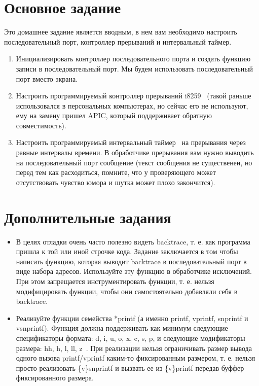 \section{Основное задание}

Это домашнее задание является вводным, в нем вам необходимо настроить
последовательный порт, контроллер прерываний и интервальный таймер.

\begin{enumerate}
  \item Инициализировать контроллер последовательного порта и создать функцию
        записи в последовательный порт. Мы будем использовать последовательный
        порт вместо экрана.
  \item Настроить программируемый контроллер прерываний i8259~\cite{INTEL:8259}
        (такой раньше использовался в персональных компьютерах, но сейчас его не
        используют, ему на замену пришел APIC, который поддерживает обратную
        совместимость).
  \item Настроить программируемый интервальный таймер~\cite{INTEL:8253} на
        прерывания через равные интервалы времени. В обработчике прерывания вам
        нужно выводить на последовательный порт сообщение (текст сообщения не
        существенен, но перед тем как расходиться, помните, что у проверяющего
        может отсутствовать чувство юмора и шутка может плохо закончится).
\end{enumerate}

\section{Дополнительные задания}

\begin{itemize}
  \item В целях отладки очень часто полезно видеть backtrace, т. е. как
        программа пришла к той или иной строчке кода. Задание заключается в том
        чтобы написать функцию, которая выводит backtrace в последовательный
        порт в виде набора адресов. Используйте эту функцию в обработчике
        исключений. При этом запрещается инструментировать функции, т. е.
        нельзя модифицировать функции, чтобы они самостоятельно добавляли себя
        в backtrace.
  \item Реализуйте функции семейства *printf (а именно printf, vprintf,
        snprintf и vsnprintf). Функция должна поддерживать как минимум
        следующие спецификаторы формата: d, i, u, o, x, c, s, p, и следующие
        модификаторы размера: hh, h, l, ll, z~\cite{CPP:PRINTF}. При реализации
        нельзя ограничивать размер вывода одного вызова printf/vprintf каким-то
        фиксированным размером, т. е. нельзя просто реализовать \{v\}snprintf и
        вызвать ее из \{v\}printf передав буффер фиксированного размера. 
\end{itemize}

